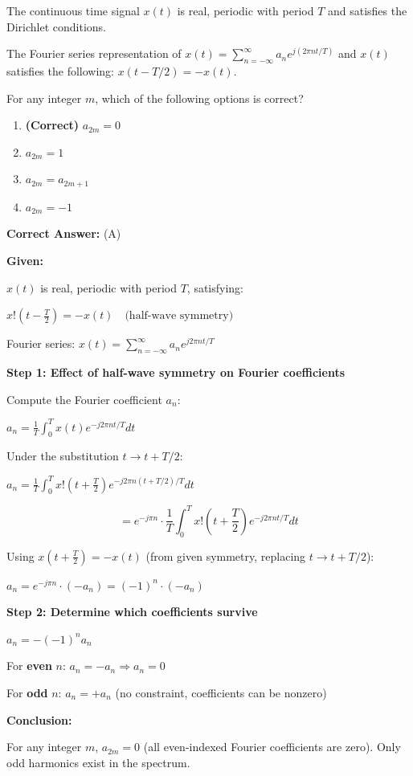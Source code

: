 \documentclass[11pt,a4paper]{article}
\begin{document}
\noindent The continuous time signal $x(t)$ is real, periodic with period $T$ and satisfies the Dirichlet conditions.

 The Fourier series representation of $x(t) = \sum_{n=-\infty}^{\infty} a_n e^{j(2\pi nt/T)}$ and $x(t)$ satisfies the following: $x(t - T/2) = -x(t)$.

 For any integer $m$, which of the following options is correct?


\begin{enumerate}[label=(\Alph*)]
    \item \textbf{(Correct)} $a_{2m} = 0$
    \item $a_{2m} = 1$
    \item $a_{2m} = a_{2m+1}$
    \item $a_{2m} = -1$
\end{enumerate}

\noindent \textbf{Correct Answer:} (A)

\begin{tcolorbox}[solbox, title=Detailed Solution -- Question 5]
\textbf{Given:}

$x(t)$ is real, periodic with period $T$, satisfying:

$x!\left(t - \frac{T}{2}\right) = -x(t) \quad \text{(half-wave symmetry)}$

Fourier series: $x(t) = \sum_{n=-\infty}^{\infty} a_n e^{j2\pi nt/T}$

\textbf{Step 1: Effect of half-wave symmetry on Fourier coefficients}

Compute the Fourier coefficient $a_n$:

$a_n = \frac{1}{T}\int_0^T x(t)e^{-j2\pi nt/T}dt$

Under the substitution $t \to t + T/2$:

$a_n = \frac{1}{T}\int_0^T x!\left(t+\frac{T}{2}\right)e^{-j2\pi n(t+T/2)/T}dt$

\[
= e^{-j\pi n} \cdot \frac{1}{T}\int_0^T x!\left(t+\frac{T}{2}\right)e^{-j2\pi nt/T}dt
\]

Using $x\left(t+\frac{T}{2}\right) = -x(t)$ (from given symmetry, replacing $t \to t + T/2$):

$a_n = e^{-j\pi n} \cdot (-a_n) = (-1)^n \cdot (-a_n)$

\textbf{Step 2: Determine which coefficients survive}

$a_n = -(-1)^n a_n$

For \textbf{even} $n$: $a_n = -a_n \Rightarrow a_n = 0$

For \textbf{odd} $n$: $a_n = +a_n$ (no constraint, coefficients can be nonzero)

\textbf{Conclusion:}

For any integer $m$, $a_{2m} = 0$ (all even-indexed Fourier coefficients are zero). Only odd harmonics exist in the spectrum.
\end{tcolorbox}
\end{document}
